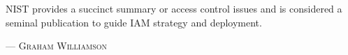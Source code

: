 NIST provides a succinct summary or access control issues and is considered a seminal publication to guide IAM strategy and deployment.
\setlength{\parindent}{0cm}\par\textsc{ --- Graham Williamson }\par\vspace{12pt}\setlength{\parindent}{15pt}

